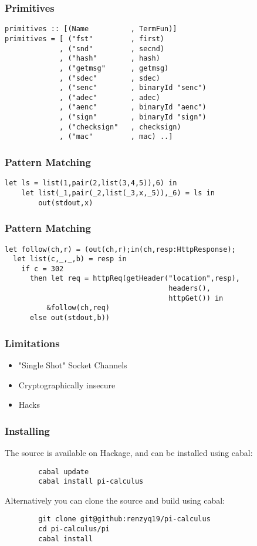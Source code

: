 \documentclass[t]{beamer}
\begin{document}
\begin{frame}[fragile]
\frametitle{Primitives}
\begin{verbatim}
primitives :: [(Name          , TermFun)]
primitives = [ ("fst"         , first)
             , ("snd"         , secnd)
             , ("hash"        , hash)
             , ("getmsg"      , getmsg)
             , ("sdec"        , sdec)
             , ("senc"        , binaryId "senc")
             , ("adec"        , adec)
             , ("aenc"        , binaryId "aenc")
             , ("sign"        , binaryId "sign")
             , ("checksign"   , checksign)
             , ("mac"         , mac) ..]
\end{verbatim}
\end{frame}

\begin{frame}[fragile]
\frametitle{Pattern Matching}
\begin{verbatim}
let ls = list(1,pair(2,list(3,4,5)),6) in 
    let list(_1,pair(_2,list(_3,x,_5)),_6) = ls in 
        out(stdout,x)
\end{verbatim}
\end{frame}

\begin{frame}[fragile]
\frametitle{Pattern Matching}
\begin{verbatim}
let follow(ch,r) = (out(ch,r);in(ch,resp:HttpResponse);
  let list(c,_,_,b) = resp in
    if c = 302 
      then let req = httpReq(getHeader("location",resp),
                                       headers(),
                                       httpGet()) in 
          &follow(ch,req) 
      else out(stdout,b)) 
\end{verbatim}
\end{frame}

\begin{frame}
\frametitle{Limitations}
\begin{itemize}
        \pause
    \item "Single Shot" Socket Channels
        \pause
    \item Cryptographically insecure 
        \pause
    \item Hacks
\end{itemize}

\end{frame}

\begin{frame}[fragile]
\frametitle{Installing}
    The source is available on Hackage, and can be installed using cabal:
    \begin{verbatim}
        cabal update
        cabal install pi-calculus
    \end{verbatim}

    Alternatively you can clone the source and build using cabal:

    \begin{verbatim}
        git clone git@github:renzyq19/pi-calculus
        cd pi-calculus/pi
        cabal install
    \end{verbatim}
\end{frame}
\end{document}
